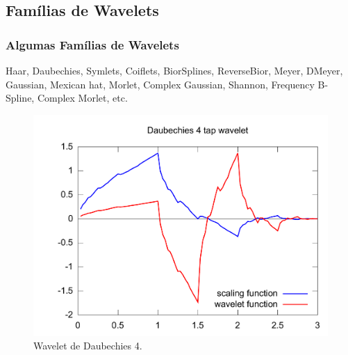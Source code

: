 \subsection{Famílias de Wavelets}

\begin{frame}[allowframebreaks]
   \frametitle{Algumas Famílias de Wavelets}
   Haar, Daubechies, Symlets, Coiflets, BiorSplines,
   ReverseBior, Meyer, DMeyer, Gaussian, Mexican hat,
   Morlet, Complex Gaussian, Shannon, Frequency B-Spline,
   Complex Morlet, etc.

   \framebreak

  \begin{figure}[hptb]
  \centering
  \includegraphics[width=.5\textwidth]{images/db4.pdf}
  \caption{Wavelet de Daubechies 4.}
  \label{fig:db4}
  \end{figure} 

  \framebreak


\end{frame}
